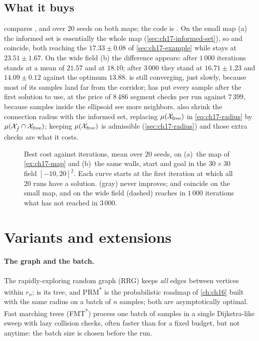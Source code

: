 \subsection{What it buys}
\label{sec:ch17-informed-results}

 compares \rrt, \rrtstar and \irrtstar over
$20$ seeds on both maps; the code is .
On the small map (a) the informed set is essentially the whole map
(\cref{sec:ch17-informed-set}), so \rrtstar and \irrtstar coincide, both
reaching the $17.33\pm0.08$ of \cref{sec:ch17-example} while \rrt stays at
$23.51\pm1.67$. On the wide field (b) the difference appears: after $1\,000$ iterations
\rrtstar stands at a mean of $21.57$ and \irrtstar at $18.10$; after $3\,000$
they stand at $16.71\pm1.23$ and $14.09\pm0.12$ against the optimum
$13.88$. \rrtstar is still converging, just slowly, because most of its
samples land far from the corridor; \irrtstar has put every sample after the
first solution to use, at the price of $8\,486$ segment checks per run
against $7\,399$, because samples inside the ellipsoid see more
neighbors. \textcite{gammell2014informed} also shrink the connection
radius with the informed set, replacing $\mu(\mathcal{X}_{\mathrm{free}})$ in
\cref{eq:ch17-radius} by $\mu(\mathcal{X}_{\hat f}\cap\mathcal{X}_{\mathrm{free}})$; keeping
$\mu(\mathcal{X}_{\mathrm{free}})$ is admissible (\cref{sec:ch17-radius}) and those extra checks
are what it costs.

\begin{figure}[tb]
  \centering
  \caption{Best cost against iterations, mean over $20$ seeds, on
  (a)~the map of \cref{ex:ch17-map} and (b)~the same walls, start and goal
  in the $30\times30$ field $[-10,20]^2$. Each curve starts at the first iteration at which
  all $20$ runs have a solution. \rrt (gray) never improves; \rrtstar and
  \irrtstar coincide on the small map, and on the wide field \irrtstar
  (dashed) reaches in $1\,000$ iterations what \rrtstar has not reached in
  $3\,000$.}
  \label{fig:ch17-convergence}
\end{figure}

\section{Variants and extensions}
\label{sec:ch17-variants}

\paragraph{The graph and the batch.} The rapidly-exploring random graph
(RRG) keeps \emph{all} edges between vertices within $r_n$;
\rrtstar is its tree, and PRM\textsuperscript{*} is the
probabilistic roadmap of \cref{ch:ch16} built with the same radius on a
batch of $n$ samples; both are asymptotically optimal. Fast marching trees (FMT\textsuperscript{*})
\cite{janson2015fmt} process one batch of samples in a single Dijkstra-like
sweep with lazy collision checks, often faster than \rrtstar for a fixed
budget, but not anytime: the batch size is chosen before the run.

